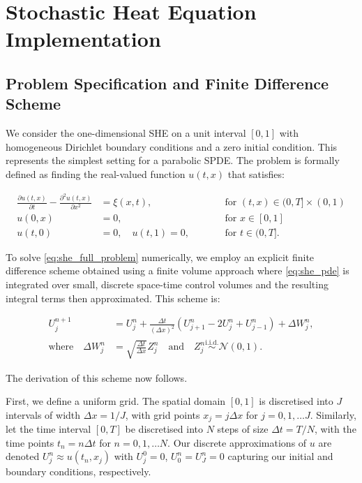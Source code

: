 \section{Stochastic Heat Equation Implementation}\label{sec:she_implementation}
\subsection{Problem Specification and Finite Difference Scheme}\label{sec:she_scheme_mlmc_imp}

We consider the one-dimensional SHE on a unit interval $[0,1]$ with
homogeneous Dirichlet boundary conditions and a zero initial condition.
This represents the simplest setting for a parabolic SPDE. 
The problem is formally defined as finding the real-valued 
function $u(t,x)$ that satisfies:

\begin{subequations} \label{eq:she_full_problem}
\begin{align}
    \frac{\partial u(t,x)}{\partial t} - \frac{\partial^2 u(t,x)}{\partial x^2} &= \xi(x,t),
    \qquad &&\text{for } (t,x) \in (0, T] \times (0,1) \label{eq:she_pde} \\
    u(0,x) &= 0, \qquad &&\text{for } x \in [0,1] \label{eq:she_ic} \\
    u(t,0) &= 0, \quad u(t,1) = 0, \qquad &&\text{for } t \in (0, T]. \label{eq:she_bc}
\end{align}
\end{subequations}

To solve \eqref{eq:she_full_problem} numerically, we employ
an explicit finite difference scheme
obtained using a finite volume approach \cite{suli2025nspdes} where \eqref{eq:she_pde}
is integrated over small, discrete space-time control volumes
and the resulting integral terms then approximated.
This scheme is:

\begin{align}
    U_j^{n+1} &= U_j^n + \frac{\Delta t}{(\Delta x)^2} 
    (U_{j+1}^n - 2U_j^n + U_{j-1}^n) + \Delta W_j^n, \label{eq:she_scheme} \\
    \text{where} \quad \Delta W_j^n &= \sqrt{\frac{\Delta t}{\Delta x}} 
    Z_j^n \quad \text{and} \quad Z_j^n \overset{\mathrm{i.i.d.}}{\sim} \mathcal{N}(0,1). \nonumber
\end{align}

The derivation of this scheme now follows.

First, we define a uniform grid. The spatial domain 
$[0,1]$ is discretised into $J$ intervals of width 
$\Delta x = 1 / J$, with grid points $x_j = j \Delta x$ for 
$j = 0, 1, \dots J$. Similarly, let the time interval 
$[0, T]$ be discretised into $N$ steps of size $\Delta t 
= T / N$, with the time points $t_n = n \Delta t$ for 
$n = 0, 1, \dots N$. 
Our discrete approximations of $u$ are denoted $U_j^n \approx 
u(t_n, x_j)$ with $U_j^0 = 0$, $U_0^n = U_J^n = 0$ 
capturing our initial and boundary conditions, respectively.

